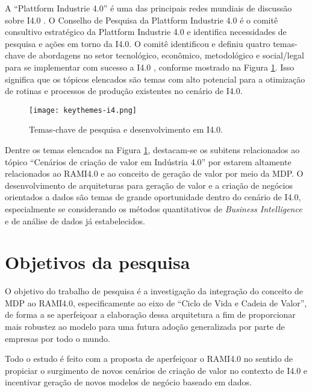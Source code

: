 	A ``Plattform Industrie 4.0'' é uma das principais redes mundiais de discussão sobre I4.0 \cite{kagermann2013recommendations, acatech2014plattform, germany2019plattform}. O Conselho de Pesquisa da Plattform Industrie 4.0 é o comitê consultivo estratégico da Plattform Industrie 4.0 e identifica necessidades de pesquisa e ações em torno da I4.0. O comitê identificou e definiu quatro temas-chave de abordagens no setor tecnológico, econômico, metodológico e social/legal para se implementar com sucesso a I4.0 \cite{hirsch-kreinsen2019keythemes}, conforme mostrado na Figura \ref{fig:keythemes-i4}. Isso significa que os tópicos elencados são temas com alto potencial para a otimização de rotinas e processos de produção existentes no cenário de I4.0.
	
	\begin{figure}[hbt!]
		\centering
		\caption{Temas-chave de pesquisa e desenvolvimento em I4.0.}
		\texttt{[image: keythemes-i4.png]}
		\label{fig:keythemes-i4}
	\end{figure}

	Dentre os temas elencados na Figura \ref{fig:keythemes-i4}, destacam-se os subitens relacionados ao tópico ``Cenários de criação de valor em Indústria 4.0'' por estarem altamente relacionados ao RAMI4.0 e ao conceito de geração de valor por meio da MDP. O desenvolvimento de arquiteturas para geração de valor e a criação de negócios orientados a dados são temas de grande oportunidade dentro do cenário de I4.0, especialmente se considerando os métodos quantitativos de \textit{Business Intelligence} e de análise de dados já estabelecidos.
	

\section{Objetivos da pesquisa}

	O objetivo do trabalho de pesquisa é a investigação da integração do conceito de MDP ao RAMI4.0, especificamente ao eixo de ``Ciclo de Vida e Cadeia de Valor'', de forma a se aperfeiçoar a elaboração dessa arquitetura a fim de proporcionar mais robustez ao modelo para uma futura adoção generalizada por parte de empresas por todo o mundo.
	
	Todo o estudo é feito com a proposta de aperfeiçoar o RAMI4.0 no sentido de propiciar o surgimento de novos cenários de criação de valor no contexto de I4.0 e incentivar geração de novos modelos de negócio baseado em dados.
	
